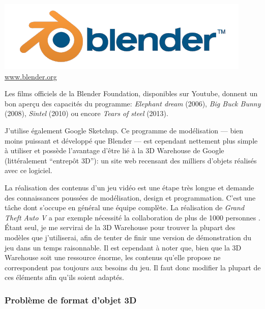 \begin{center}
\includegraphics[width=.5\textwidth]{./images/Technique/blender-plain.png}
\\[-4mm]\hspace*{5mm}\url{www.blender.org}
\end{center}

Les films officiels de la Blender Foundation, disponibles sur Youtube, donnent un bon aperçu des capacités du programme: \textit{Elephant dream} (2006), \textit{Big Buck Bunny} (2008), \textit{Sintel} (2010) ou encore \textit{Tears of steel} (2013).

J'utilise également Google Sketchup. Ce programme de modélisation --- bien moins puissant et développé que Blender --- est cependant nettement plus simple à utiliser et possède l'avantage d'être lié à la 3D Warehouse de Google (littéralement \enquote{entrepôt 3D}): un site web recensant des milliers d'objets réalisés avec ce logiciel.

La réalisation des contenus d'un jeu vidéo est une étape très longue et demande des connaissances poussées de modélisation, design et programmation. C'est une tâche dont s'occupe en général une équipe complète. La réalisation de \textit{Grand Theft Auto V} a par exemple nécessité la collaboration de plus de 1000 personnes \cite{RockstarMorethan1000peoplemadeGTAV_}. Étant seul, je me servirai de la 3D Warehouse pour trouver la plupart des modèles que j'utiliserai, afin de tenter de finir une version de démonstration du jeu dans un temps raisonnable. Il est cependant à noter que, bien que la 3D Warehouse soit une ressource énorme, les contenus qu'elle propose ne correspondent pas toujours aux besoins du jeu. Il faut donc modifier la plupart de ces éléments afin qu'ils soient adaptés.


\subsubsection{Problème de format d'objet 3D}

